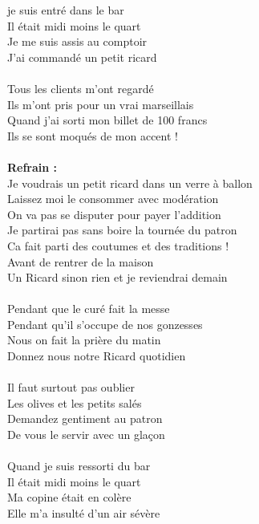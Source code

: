 
 je suis entré dans le bar
\\Il était midi moins le quart
\\Je me suis assis au comptoir
\\J'ai commandé un petit ricard
\\\\Tous les clients m'ont regardé
\\Ils m'ont pris pour un vrai marseillais
\\Quand j'ai sorti mon billet de 100 francs
\\Ils se sont moqués de mon accent !
\\\\\textbf{Refrain :}
\\Je voudrais un petit ricard dans un verre à ballon
\\Laissez moi le consommer avec modération
\\On va pas se disputer pour payer l'addition
\\Je partirai pas sans boire la tournée du patron
\\Ca fait parti des coutumes et des traditions !
\\Avant de rentrer de la maison
\\Un Ricard sinon rien et je reviendrai demain
\\\\Pendant que le curé fait la messe
\\Pendant qu'il s'occupe de nos gonzesses
\\Nous on fait la prière du matin
\\Donnez nous notre Ricard quotidien
\\\\Il faut surtout pas oublier
\\Les olives et les petits salés
\\Demandez gentiment au patron
\\De vous le servir avec un glaçon
\\\\Quand je suis ressorti du bar
\\Il était midi moins le quart
\\Ma copine était en colère
\\Elle m'a insulté d'un air sévère
\breakpage
